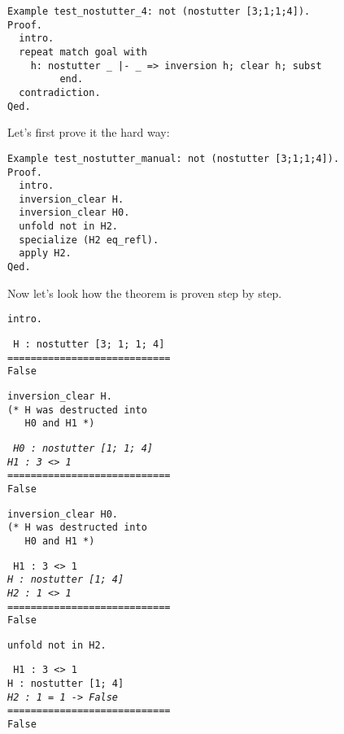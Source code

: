 \documentclass[12pt]{article}
\newcommand{\codeBlock}[1]{\colorbox{cverbbg}{\parbox{0.85\textwidth}{#1}}}
\begin{document}
\begin{verbatim}
Example test_nostutter_4: not (nostutter [3;1;1;4]).
Proof.
  intro.
  repeat match goal with
    h: nostutter _ |- _ => inversion h; clear h; subst
         end.
  contradiction.
Qed.
\end{verbatim}

Let's first prove it the hard way:

\begin{verbatim}
Example test_nostutter_manual: not (nostutter [3;1;1;4]).
Proof.
  intro.
  inversion_clear H.
  inversion_clear H0.
  unfold not in H2.
  specialize (H2 eq_refl).
  apply H2.
Qed.
\end{verbatim}

Now let's look how the theorem is proven step by step.

\vspace{1em}
\begin{minipage}[t]{.45\textwidth}
\begin{verbatim}
intro.
\end{verbatim}

\codeBlock{\tt{
H : nostutter [3; 1; 1; 4]\\
============================\\
False
}}
\end{minipage}
\hfill
\begin{minipage}[t]{.45\textwidth}
\begin{verbatim}
inversion_clear H.
(* H was destructed into
   H0 and H1 *)
\end{verbatim}

\codeBlock{\tt{
\textit{H0 : nostutter [1; 1; 4]}\\
\textit{H1 : 3 <> 1}\\
============================\\
False
}}
\end{minipage}

\vspace{2em}
\begin{minipage}[t]{.45\textwidth}
\begin{verbatim}
inversion_clear H0.
(* H was destructed into
   H0 and H1 *)
\end{verbatim}

\codeBlock{{\tt
H1 : 3 <> 1\\
\textit{H : nostutter [1; 4]}\\
\textit{H2 : 1 <> 1}\\
============================\\
False
}}
\end{minipage}
\hfill
\begin{minipage}[t]{.45\textwidth}
\begin{verbatim}
unfold not in H2.
\end{verbatim}

\codeBlock{{\tt
      H1 : 3 <> 1\\
      H : nostutter [1; 4]\\
      \textit{H2 : 1 = 1 -> False}\\
      ============================\\
      False
}}
\end{minipage}
\end{document}
